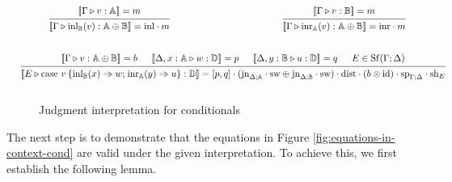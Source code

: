 \documentclass[10pt,a4paper]{amsart}
\theoremstyle{definition}
\theoremstyle{definition}
\theoremstyle{definition}
\theoremstyle{definition}
\theoremstyle{definition}
\theoremstyle{definition}
\begin{document}
\begin{figure}[H]
  \begin{equation*}
  \begin{aligned}
  &\hspace{10pt}
  \begin{prooftree}
      \hypo{ [\![\Gamma \triangleright v: \mathbb{A}]\!] = m }
      \infer1[]{ [\![ \Gamma \triangleright \text{inl}_{\mathbb{B}} (v):  \mathbb{A} \oplus \mathbb{B}  ]\!] = \inl  \comp m}
  \end{prooftree}
  \hspace{120pt}
  \begin{prooftree}
    \hypo{ [\![\Gamma \triangleright v: \mathbb{B}]\!] = m }
    \infer1[]{ [\![ \Gamma \triangleright \text{inr}_{\mathbb{A}} (v):  \mathbb{A} \oplus \mathbb{B}  ]\!] = \inr  \comp m}
\end{prooftree}
  \\[20pt]
  &\hspace{-20pt}
  \begin{prooftree}
      \hypo{[\![\Gamma\triangleright v: \mathbb{A} \oplus \mathbb{B} ]\!] = b}
      \hypo{[\![\Delta, x:\mathbb{A} \triangleright w: \mathbb{D} ]\!] = p}
      \hypo{ [\![\Delta,y:\mathbb{B} \triangleright u: \mathbb{D} ]\!] = q }
      \hypo{E \in \Shuff(\Gamma; \Delta)}
      \infer4[]{ [\![E \vljud \text{case } v \hspace{2pt}  \{\text{inl}_{\mathbb{B}} (x) \Rightarrow w ; \hspace{1pt} \text{inr}_{\mathbb{A}} (y) \Rightarrow u\}: \mathbb{D} ]\!] =   [p,q] \comp (\text{jn}_{\Delta;\typeA}\comp \sw \oplus \text{jn}_{\Delta;\mathbb{B}}\comp \sw) \comp \dist \comp (b \otimes \text{id}) \cdot \text{sp}_{\Gamma;\Delta} \cdot \text{sh}_{E}}
  \end{prooftree}
  \\[10pt]
  \end{aligned}
  \end{equation*}
  \caption{Judgment interpretation for conditionals}
\label{fig:denotational_sem cond}
\end{figure}

The next step is to demonstrate that the equations in Figure \ref{fig:equations-in-context-cond} are valid under the given interpretation. To achieve this, we first establish the following lemma.
\end{document}
